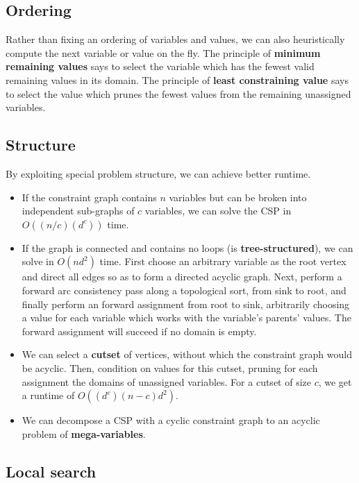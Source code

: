 \documentclass[12pt]{article}
\begin{document}
\subsection{Ordering}

Rather than fixing an ordering of variables and values, we can also heuristically compute the next variable or value on the fly. The principle of \textbf{minimum remaining values} says to select the variable which has the fewest valid remaining values in its domain. The principle of \textbf{least constraining value} says to select the value which prunes the fewest values from the remaining unassigned variables.

\subsection{Structure}

By exploiting special problem structure, we can achieve better runtime.
\begin{itemize}
\item If the constraint graph contains $n$ variables but can be broken into independent sub-graphs of $c$ variables, we can solve the CSP in $O\left((n/c) (d^c)\right)$ time.
\item If the graph is connected and contains no loops (is \textbf{tree-structured}), we can solve in $O\left(nd^2\right)$ time. First choose an arbitrary variable as the root vertex and direct all edges so as to form a directed acyclic graph. Next, perform a forward arc consistency pass along a topological sort, from sink to root, and finally perform an forward assignment from root to sink, arbitrarily choosing a value for each variable which works with the variable's parents' values. The forward assignment will succeed if no domain is empty.
\item We can select a \textbf{cutset} of vertices, without which the constraint graph would be acyclic. Then, condition on values for this cutset, pruning for each assignment the domains of unassigned variables. For a cutset of size $c$, we get a runtime of $O\left((d^c)(n - c)d^2\right)$.
\item We can decompose a CSP with a cyclic constraint graph to an acyclic problem of \textbf{mega-variables}.
\end{itemize}

\subsection{Local search}
\end{document}
